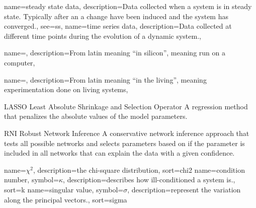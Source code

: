 {
  name={steady state data},
  description={Data collected when a system is in steady state. Typically after an a change have been induced and the system has converged.},
  see={ss},
}
{
  name={time series data},
  description={Data collected at different time points during the evolution of a dynamic system.},
}

{
  name={\insilico},
  description={From latin meaning ``in silicon'', meaning run on a computer},
}

{
  name={\invivo},
  description={From latin meaning ``in the living'', meaning experimentation done on living systems},
}

{LASSO}
{Least Absolute Shrinkage and Selection Operator}
{A regression method that penalizes the absolute values of the model parameters.\cite{Tibshirani1996}}

{RNI}
{Robust Network Inference}
{A conservative network inference approach that tests all possible networks and selects parameters based on if the parameter is included in all networks that can explain the data with a given confidence\cite{Nordling2013phdthesis}.}

{
  name={\ensuremath{\chi^2}},
  description={the chi-square distribution},
  sort=chi2
}
{
  name={condition number},
  symbol={\ensuremath{\kappa}},
  description={describes how ill-conditioned a system is.},
  sort=k
}
{
  name={singular value},
  symbol={\ensuremath{\sigma}},
  description={represent the variation along the principal vectors.},
  sort=sigma
}